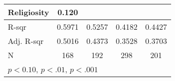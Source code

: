 {\begin{tabular}{l*{4}{c}}
    \addlinespace
    Religiosity         & 0.120\sym{*}  &                &                &                        \\
    \midrule
    R-sqr               & 0.5971        & 0.5257         & 0.4182         & 0.4427                 \\
    Adj. R-sqr          & 0.5016        & 0.4373         & 0.3528         & 0.3703                 \\
    N                   & 168           & 192            & 298            & 201                    \\
    \bottomrule
    \multicolumn{5}{l}{\footnotesize \sym{*} \(p<0.10\), \sym{**} \(p<.01\), \sym{***} \(p<.001\)} \\
\end{tabular}
}
